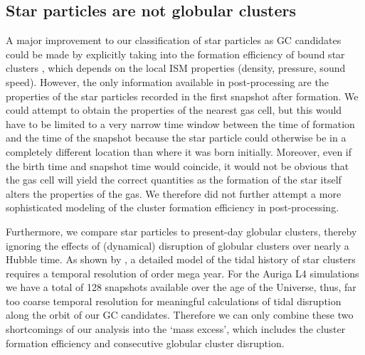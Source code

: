 \documentclass[a4paper,fleqn,usenatbib]{mnras}
\begin{document}
\subsection{Star particles are not globular clusters}
\label{sec:discussion_mass_excess}
A major improvement to our classification of star particles as GC candidates
could be made by explicitly taking into the formation efficiency of bound star
clusters \citep{2012MNRAS.426.3008K}, which depends on the local ISM properties
(density, pressure, sound speed). However, the only information available in
post-processing are the properties of the star particles recorded in the first
snapshot after formation. We could attempt to obtain the properties of the nearest
gas cell, but this would have to be limited to a very narrow time window between
the time of formation and the time of the snapshot because the star particle could
otherwise be in a completely different location than where it was born initially.
Moreover, even if the birth time and snapshot time would coincide, it would not
be obvious that the gas cell will yield the correct quantities as the formation
of the star itself alters the properties of the gas. We therefore did not further
attempt a more sophisticated modeling of the cluster formation efficiency in
post-processing.

Furthermore, we compare star particles to present-day globular clusters, thereby
ignoring the effects of (dynamical) disruption of globular clusters over nearly
a Hubble time. As shown by \citep{2018MNRAS.475.4309P}, a detailed model of the tidal
history of star clusters requires a temporal resolution of order mega year. For
the Auriga L4 simulations we have a total of 128 snapshots available over the
age of the Universe, thus, far too coarse temporal resolution for meaningful
calculations of tidal disruption along the orbit of our GC candidates. Therefore
we can only combine these two shortcomings of our analysis into the `mass excess',
which includes the cluster formation efficiency and consecutive globular cluster
disruption.
\end{document}
